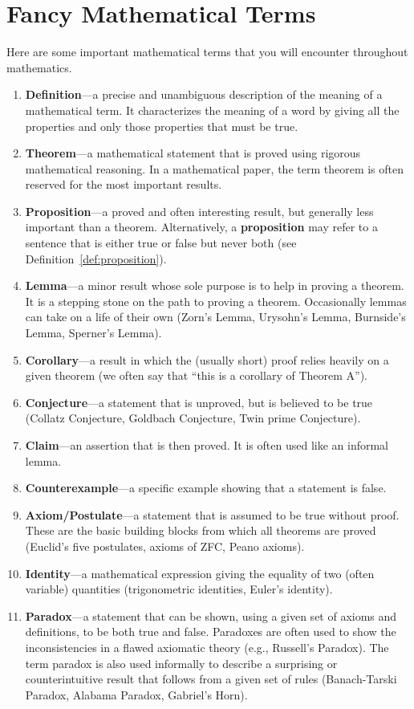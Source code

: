 \chapter{Fancy Mathematical Terms}
\label{appendix:fancy_math_terms}

Here are some important mathematical terms that you will encounter throughout mathematics.

\begin{enumerate}
\item \textbf{Definition}---a precise and unambiguous description of the meaning of a mathematical term.  It characterizes the meaning of a word by giving all the properties and only those properties that must be true.
\item \textbf{Theorem}---a mathematical statement that is proved using rigorous mathematical reasoning.  In a mathematical paper, the term theorem is often reserved for the most important results.
\item \textbf{Proposition}---a proved and often interesting result, but generally less important than a theorem. Alternatively, a \textbf{proposition} may refer to a sentence that is either true or false but never both (see Definition~\ref{def:proposition}). 
\item \textbf{Lemma}---a minor result whose sole purpose is to help in proving a theorem.  It is a stepping stone on the path to proving a theorem. Occasionally lemmas can take on a life of their own (Zorn's Lemma, Urysohn's Lemma, Burnside's Lemma, Sperner's Lemma).
\item \textbf{Corollary}---a result in which the (usually short) proof relies heavily on a given theorem (we often say that ``this is a corollary of Theorem A'').
\item \textbf{Conjecture}---a statement that is unproved, but is believed to be true (Collatz Conjecture, Goldbach Conjecture, Twin prime Conjecture).
\item \textbf{Claim}---an assertion that is then proved.  It is often used like an informal lemma.
\item \textbf{Counterexample}---a specific example showing that a statement is false.
\item \textbf{Axiom/Postulate}---a statement that is assumed to be true without proof. These are the basic building blocks from which all theorems are proved (Euclid's five postulates, axioms of ZFC, Peano axioms).
\item \textbf{Identity}---a mathematical expression giving the equality of two (often variable) quantities (trigonometric identities, Euler's identity).
\item \textbf{Paradox}---a statement that can be shown, using a given set of axioms and definitions, to be both true and false. Paradoxes are often used to show the inconsistencies in a flawed axiomatic theory (e.g., Russell's Paradox).  The term paradox is also used informally to describe a surprising or counterintuitive result that follows from a given set of rules (Banach-Tarski Paradox, Alabama Paradox, Gabriel's Horn).
\end{enumerate}